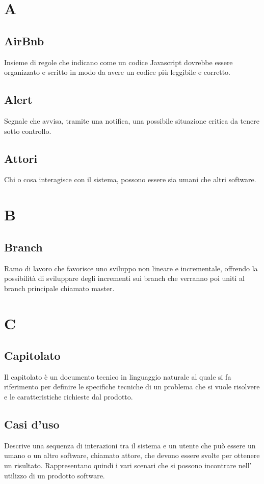 \section{A}
    \subsection*{AirBnb}
Insieme di regole che indicano come un codice Javascript dovrebbe essere organizzato e scritto in modo da avere un codice più leggibile e corretto.
    \subsection*{Alert}
Segnale che avvisa, tramite una notifica, una possibile situazione critica da tenere sotto controllo.
    \subsection*{Attori}
Chi o cosa interagisce con il sistema, possono essere sia umani che altri software.
\newpage

\section{B}
    \subsection*{Branch}
Ramo di lavoro che favorisce uno sviluppo non lineare e incrementale, offrendo la possibilità di sviluppare degli incrementi sui branch che verranno poi uniti al branch principale chiamato master.
\newpage

\section{C}
    \subsection*{Capitolato}
Il capitolato è un documento tecnico in linguaggio naturale al quale si fa riferimento per definire le specifiche tecniche di un problema che si vuole risolvere e le caratteristiche richieste dal prodotto.
    \subsection*{Casi d’uso}
Descrive una sequenza di interazioni tra il sistema e un utente che può essere un umano o un altro software, chiamato attore, che devono essere svolte per ottenere un risultato. Rappresentano quindi i vari scenari che si possono incontrare nell’ utilizzo di un prodotto software.
